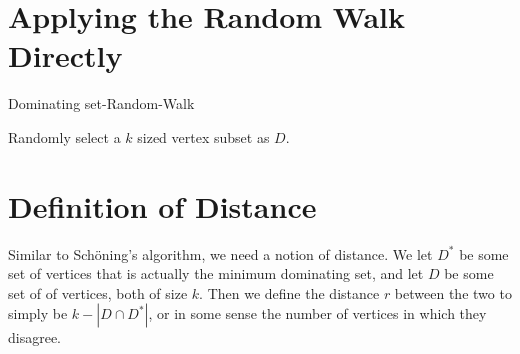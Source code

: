 \documentclass{article}
\begin{document}
\section{Applying the Random Walk Directly}
	\begin{algorithm}[H]
	\caption{Dominating set-Random-Walk}
	\DontPrintSemicolon
	\BlankLine
	Randomly select a $k$ sized vertex subset as $D$.\\
	\hspace{7em}
\end{algorithm}
	
\section{Definition of Distance}
	Similar to Sch\"{o}ning's algorithm, we need a notion of distance. We let $D^*$ be some set of vertices that is actually the minimum dominating set, and let $D$ be some set of of vertices, both of size $k$. Then we define the distance $r$ between the two to simply be $k - |D \cap D^*|$, or in some sense the number of vertices in which they disagree.\par
\end{document}
